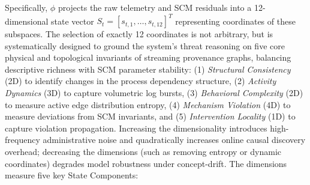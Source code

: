 Specifically, $\phi$ projects the raw telemetry and SCM residuals into a 12-dimensional state vector $S_t = [s_{t,1}, \dots, s_{t,12}]^T$ representing coordinates of these subspaces. The selection of exactly 12 coordinates is not arbitrary, but is systematically designed to ground the system's threat reasoning on five core physical and topological invariants of streaming provenance graphs, balancing descriptive richness with SCM parameter stability: (1) \textit{Structural Consistency} (2D) to identify changes in the process dependency structure, (2) \textit{Activity Dynamics} (3D) to capture volumetric log bursts, (3) \textit{Behavioral Complexity} (2D) to measure active edge distribution entropy, (4) \textit{Mechanism Violation} (4D) to measure deviations from SCM invariants, and (5) \textit{Intervention Locality} (1D) to capture violation propagation. Increasing the dimensionality introduces high-frequency administrative noise and quadratically increases online causal discovery overhead; decreasing the dimensions (such as removing entropy or dynamic coordinates) degrades model robustness under concept-drift. The dimensions measure five key State Components:
